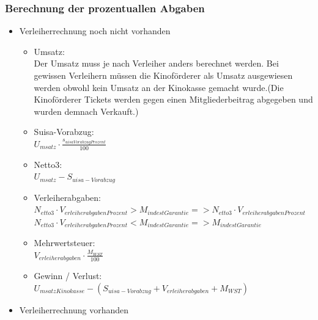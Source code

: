 \documentclass[
]{article}
\providecommand{\tightlist}{%
  \setlength{\itemsep}{0pt}\setlength{\parskip}{0pt}}
\begin{document}
\subsubsection{Berechnung der prozentuallen
Abgaben}\label{berechnung-der-prozentuallen-abgaben}

\begin{itemize}
\tightlist
\item
  Verleiherrechnung noch nicht vorhanden

  \begin{itemize}
  \tightlist
  \item
    Umsatz:\\
    Der Umsatz muss je nach Verleiher anders berechnet werden. Bei
    gewissen Verleihern müssen die Kinoförderer als Umsatz ausgewiesen
    werden obwohl kein Umsatz an der Kinokasse gemacht wurde.(Die
    Kinoförderer Tickets werden gegen einen Mitgliederbeitrag abgegeben
    und wurden demnach Verkauft.)
  \item
    Suisa-Vorabzug:\\
    \(U_{msatz}\cdot  \frac {s_{uisaVorabzugProzent}}{100}\)
  \item
    Netto3:\\
    \(U_{msatz}-S_{uisa-Vorabzug}\)
  \item
    Verleiherabgaben:\\
    \(N_{etto3} \cdot V_{erleiherabgabenProzent} > M_{indestGarantie} => N_{etto3} \cdot V_{erleiherabgabenProzent}\)\\
    \(N_{etto3} \cdot V_{erleiherabgabenProzent} < M_{indestGarantie} => M_{indestGarantie}\)
  \item
    Mehrwertsteuer:\\
    \(V_{erleiherabgaben}\cdot \frac{M_{WST}}{100}\)
  \item
    Gewinn / Verlust:\\
    \(U_{msatzKinokasse} - (S_{uisa-Vorabzug} + V_{erleiherabgaben} + M_{WST})\)
  \end{itemize}
\item
  Verleiherrechnung vorhanden


\end{itemize}
\end{document}
